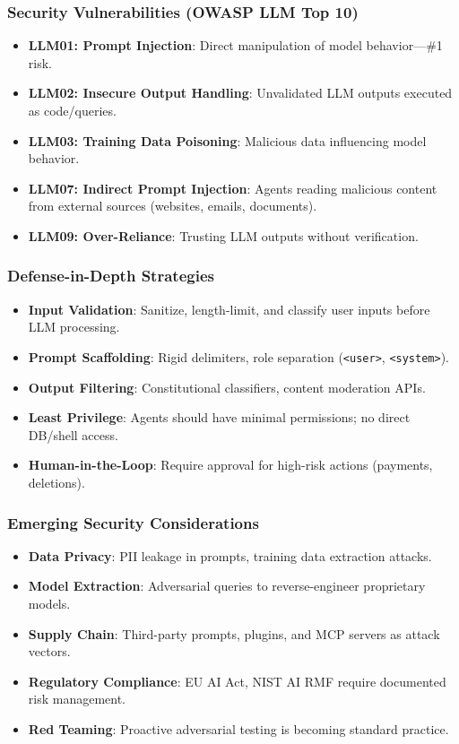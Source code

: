 \documentclass{beamer}
\begin{document}
\begin{frame}
    \frametitle{Security Vulnerabilities (OWASP LLM Top 10)}
    \begin{itemize}
        \item \textbf{LLM01: Prompt Injection}: Direct manipulation of model behavior---\#1 risk.
        \item \textbf{LLM02: Insecure Output Handling}: Unvalidated LLM outputs executed as code/queries.
        \item \textbf{LLM03: Training Data Poisoning}: Malicious data influencing model behavior.
        \item \textbf{LLM07: Indirect Prompt Injection}: Agents reading malicious content from external sources (websites, emails, documents).
        \item \textbf{LLM09: Over-Reliance}: Trusting LLM outputs without verification.
    \end{itemize}
\end{frame}

\begin{frame}
    \frametitle{Defense-in-Depth Strategies}
    \begin{itemize}
        \item \textbf{Input Validation}: Sanitize, length-limit, and classify user inputs before LLM processing.
        \item \textbf{Prompt Scaffolding}: Rigid delimiters, role separation (\texttt{<user>}, \texttt{<system>}).
        \item \textbf{Output Filtering}: Constitutional classifiers, content moderation APIs.
        \item \textbf{Least Privilege}: Agents should have minimal permissions; no direct DB/shell access.
        \item \textbf{Human-in-the-Loop}: Require approval for high-risk actions (payments, deletions).
    \end{itemize}
\end{frame}

\begin{frame}
    \frametitle{Emerging Security Considerations}
    \begin{itemize}
        \item \textbf{Data Privacy}: PII leakage in prompts, training data extraction attacks.
        \item \textbf{Model Extraction}: Adversarial queries to reverse-engineer proprietary models.
        \item \textbf{Supply Chain}: Third-party prompts, plugins, and MCP servers as attack vectors.
        \item \textbf{Regulatory Compliance}: EU AI Act, NIST AI RMF require documented risk management.
        \item \textbf{Red Teaming}: Proactive adversarial testing is becoming standard practice.
    \end{itemize}
\end{frame}
\end{document}
